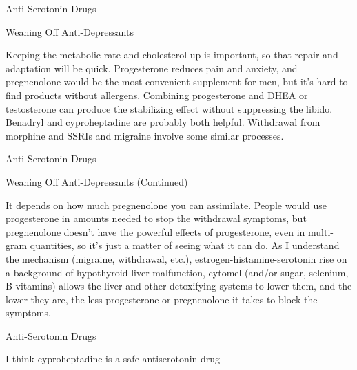 \documentclass[11pt,oneside,openany,extrafontsizes]{memoir}
\begin{document}
\begin{standalonequote}{Anti-Serotonin Drugs}
    \begin{note}
        Weaning Off Anti-Depressants
    \end{note}

    \begin{answer}
        Keeping the metabolic rate and cholesterol up is important, so that repair and adaptation will be quick. Progesterone reduces pain and anxiety, and pregnenolone would be the most convenient supplement for men, but it's hard to find products without allergens. Combining progesterone and DHEA or testosterone can produce the stabilizing effect without suppressing the libido. Benadryl and cyproheptadine are probably both helpful. Withdrawal from morphine and SSRIs and migraine involve some similar processes.
    \end{answer}
\end{standalonequote}

\begin{standalonequote}{Anti-Serotonin Drugs}
    \begin{note}
        Weaning Off Anti-Depressants (Continued)
    \end{note}

    \begin{answer}
        It depends on how much pregnenolone you can assimilate. People would use progesterone in amounts needed to stop the withdrawal symptoms, but pregnenolone doesn't have the powerful effects of progesterone, even in multi-gram quantities, so it's just a matter of seeing what it can do. As I understand the mechanism (migraine, withdrawal, etc.), estrogen-histamine-serotonin rise on a background of hypothyroid liver malfunction, cytomel (and/or sugar, selenium, B vitamins) allows the liver and other detoxifying systems to lower them, and the lower they are, the less progesterone or pregnenolone it takes to block the symptoms.
    \end{answer}
\end{standalonequote}

\begin{standalonequote}{Anti-Serotonin Drugs}

    \begin{answer}
        I think cyproheptadine is a safe antiserotonin drug
    \end{answer}
\end{standalonequote}
\end{document}

